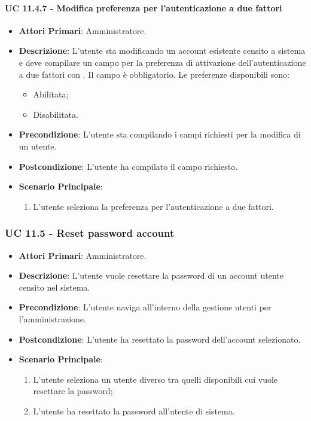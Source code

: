 				\paragraph{UC 11.4.7 - Modifica preferenza per l'autenticazione a due fattori}
				\begin{itemize}
					\item \textbf{Attori Primari}: Amministratore.
					\item \textbf{Descrizione}: L'utente sta modificando un account esistente censito a sistema e deve compilare un campo per la preferenza di attivazione dell'autenticazione a due fattori con . Il campo è obbligatorio. Le preferenze disponibili sono:
					\begin{itemize}
						\item Abilitata;
						\item Disabilitata.
					\end{itemize}
					\item \textbf{Precondizione}: L'utente sta compilando i campi richiesti per la modifica di un utente.
					\item \textbf{Postcondizione}: L'utente ha compilato il campo richiesto.
					\item \textbf{Scenario Principale}:
					\begin{enumerate}
						\item{L'utente seleziona la preferenza per l'autenticazione a due fattori.}
					\end{enumerate}	
				\end{itemize}



			\subsubsection{UC 11.5 - Reset password account}
			\begin{itemize}
				\item \textbf{Attori Primari}: Amministratore.
				\item \textbf{Descrizione}: L'utente vuole resettare la password di un account utente censito nel sistema.
				\item \textbf{Precondizione}: L'utente naviga all'interno della gestione utenti per l'amministrazione.
				\item \textbf{Postcondizione}: L'utente ha resettato la password dell'account selezionato.
				\item \textbf{Scenario Principale}:
				\begin{enumerate}
					\item{L'utente seleziona un utente diverso tra quelli disponibili cui vuole resettare la password;}
					\item{L'utente ha resettato la password all'utente di sistema.}
				\end{enumerate}		
			\end{itemize}


